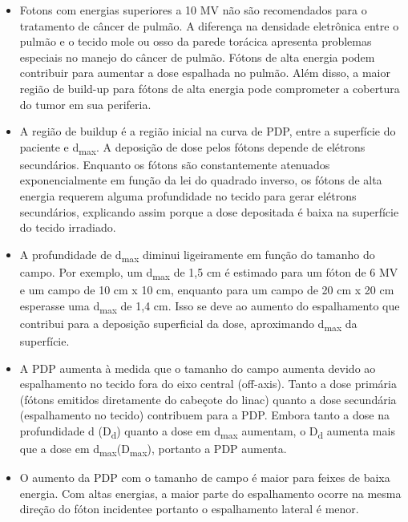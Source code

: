 \documentclass[11pt,a4paper]{article}
\newcounter{exemplo}
\begin{document}
\begin{exemplo}
\begin{itemize}
        \item Fotons com energias superiores a 10 MV não são recomendados para o tratamento de câncer de pulmão. A diferença na densidade eletrônica entre o pulmão e o tecido mole ou osso da parede torácica apresenta problemas especiais no manejo do câncer de pulmão. Fótons de alta energia podem contribuir para aumentar a dose espalhada no pulmão. Além disso, a maior região de build-up para fótons de alta energia pode comprometer a cobertura do tumor em sua periferia.
        
        \item A região de buildup é a região inicial na curva de PDP, entre a superfície do paciente e d\textsubscript{max}. A deposição de dose pelos fótons depende de elétrons secundários. Enquanto os fótons são constantemente atenuados exponencialmente em função da lei do quadrado inverso, os fótons de alta energia requerem alguma profundidade no tecido para gerar elétrons secundários, explicando assim porque a dose depositada é baixa na superfície do tecido irradiado.
        
        \item A profundidade de d\textsubscript{max} diminui ligeiramente em função do tamanho do campo. Por exemplo, um d\textsubscript{max} de 1,5 cm é estimado para um fóton de 6 MV e um campo de 10 cm x 10 cm, enquanto para um campo de 20 cm x 20 cm esperasse uma  d\textsubscript{max} de 1,4 cm. Isso se deve ao aumento do espalhamento que contribui para a deposição superficial da dose, aproximando d\textsubscript{max} da superfície.
        
        \item A PDP aumenta à medida que o tamanho do campo aumenta devido ao espalhamento no tecido fora do eixo central (off-axis). Tanto a dose primária (fótons emitidos diretamente do cabeçote do linac) quanto a dose secundária (espalhamento no tecido) contribuem para a PDP. Embora tanto a dose na profundidade d (D\textsubscript{d}) quanto a dose em d\textsubscript{max} aumentam, o D\textsubscript{d} aumenta mais que a dose em d\textsubscript{max}(D\textsubscript{max}), portanto a PDP aumenta.
        
        \item O aumento da PDP com o tamanho de campo é maior para feixes de baixa energia. Com altas energias, a maior parte do espalhamento ocorre na mesma direção do fóton incidentee portanto o espalhamento lateral é menor.
        

\end{itemize}
\end{exemplo}
\end{document}
